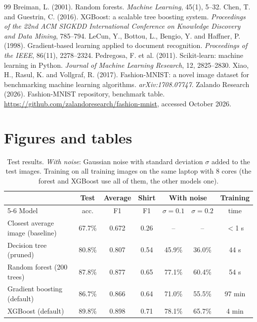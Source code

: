 \documentclass[11pt,a4paper]{article}
\begin{document}
\begin{thebibliography}{99}
\setlength{\itemsep}{1pt}
\small
{} Breiman, L. (2001). Random forests. \textit{Machine Learning}, 45(1), 5--32.
 Chen, T. and Guestrin, C. (2016). XGBoost: a scalable tree boosting system. \textit{Proceedings of the 22nd ACM SIGKDD International Conference on Knowledge Discovery and Data Mining}, 785--794.
 LeCun, Y., Bottou, L., Bengio, Y. and Haffner, P. (1998). Gradient-based learning applied to document recognition. \textit{Proceedings of the IEEE}, 86(11), 2278--2324.
 Pedregosa, F. et al. (2011). Scikit-learn: machine learning in Python. \textit{Journal of Machine Learning Research}, 12, 2825--2830.
 Xiao, H., Rasul, K. and Vollgraf, R. (2017). Fashion-MNIST: a novel image dataset for benchmarking machine learning algorithms. \textit{arXiv:1708.07747}.
 Zalando Research (2026). Fashion-MNIST repository, benchmark table. \url{https://github.com/zalandoresearch/fashion-mnist}, accessed October 2026.
\end{thebibliography}

\clearpage
\appendix
\section{Figures and tables}
\label{app:results}

\begin{table}[H]
\centering
\small
\begin{tabular}{lcccccc}
\toprule
 & Test & Average & Shirt & \multicolumn{2}{c}{With noise} & Training \\
\cmidrule(lr){5-6}
Model & acc. & F1 & F1 & $\sigma=0.1$ & $\sigma=0.2$ & time \\
\midrule
Closest average image (baseline) & 67.7\% & 0.672 & 0.26 & -- & -- & $<$1 s \\
Decision tree (pruned)           & 80.8\% & 0.807 & 0.54 & 45.9\% & 36.0\% & 44 s \\
Random forest (200 trees)        & 87.8\% & 0.877 & 0.65 & 77.1\% & 60.4\% & 54 s \\
Gradient boosting (default)      & 86.7\% & 0.866 & 0.64 & 71.0\% & 55.5\% & 97 min \\
XGBoost (default)                & 89.8\% & 0.898 & 0.71 & 78.1\% & 65.7\% & 4 min \\
\bottomrule
\end{tabular}
\caption{Test results. \emph{With noise}: Gaussian noise with standard deviation $\sigma$ added to the test images. Training on all training images on the same laptop with 8 cores (the forest and XGBoost use all of them, the other models one).}
\label{tab:results}
\end{table}
\end{document}
